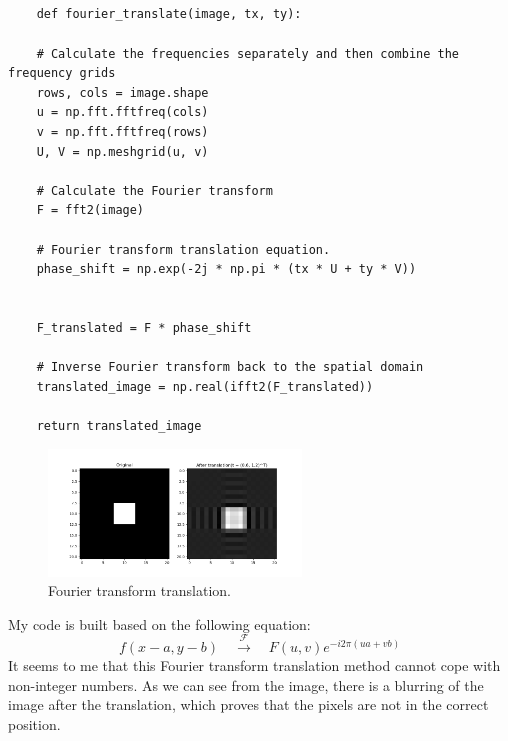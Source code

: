 \documentclass[12pt]{article}
\begin{document}
\subsection{}
\begin{lstlisting}
    def fourier_translate(image, tx, ty):

    # Calculate the frequencies separately and then combine the frequency grids
    rows, cols = image.shape
    u = np.fft.fftfreq(cols)  
    v = np.fft.fftfreq(rows)  
    U, V = np.meshgrid(u, v)  

    # Calculate the Fourier transform
    F = fft2(image)
    
    # Fourier transform translation equation.
    phase_shift = np.exp(-2j * np.pi * (tx * U + ty * V))

    
    F_translated = F * phase_shift

    # Inverse Fourier transform back to the spatial domain
    translated_image = np.real(ifft2(F_translated))

    return translated_image
\end{lstlisting}

\begin{figure}[ht]
    \centering
    \includegraphics[width=0.6\textwidth]{pics/a6_1.7.png} 
    \caption{Fourier transform translation.}
\end{figure}
My code is built based on the following equation:
\[
f(x - a, y - b) \quad \xrightarrow{\mathcal{F}} \quad F(u,v) e^{-i 2\pi (ua + vb)}
\]
It seems to me that this Fourier transform translation method cannot cope with non-integer numbers. As we can see from the image, there is a blurring of the image after the translation, which proves that the pixels are not in the correct position.
\end{document}
